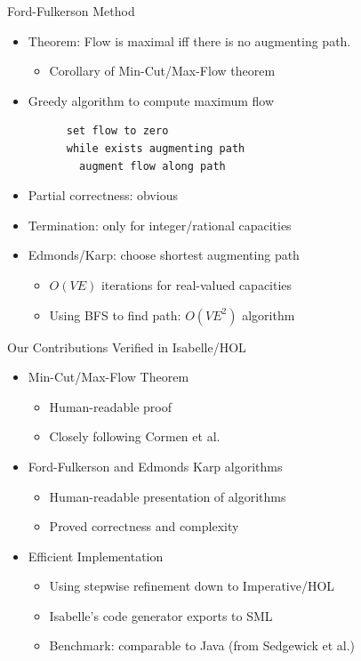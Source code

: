 \documentclass[fleqn]{beamer}
\begin{document}
\begin{frame}[fragile]{Ford-Fulkerson Method}
  \begin{itemize}
   \item<+-> Theorem: Flow is maximal iff there is no augmenting path.
    \begin{itemize}
     \item Corollary of Min-Cut/Max-Flow theorem
    \end{itemize}
   \item<+-> Greedy algorithm to compute maximum flow
    \begin{lstlisting}
      set flow to zero
      while exists augmenting path
        augment flow along path
    \end{lstlisting}%
   \item<+-> Partial correctness: obvious
   \item<+-> Termination: only for integer/rational capacities
   \item<+-> Edmonds/Karp: choose shortest augmenting path
    \begin{itemize}
     \item $O(VE)$ iterations for real-valued capacities
     \item Using BFS to find path: $O(VE^2)$ algorithm

    \end{itemize}
  \end{itemize}
\end{frame}
\begin{frame}{Our Contributions}
  {Verified in Isabelle/HOL}

  \begin{itemize}
   \item<+-> Min-Cut/Max-Flow Theorem
    \begin{itemize}
     \item Human-readable proof
     \item Closely following Cormen et al.
    \end{itemize}
   \item<+-> Ford-Fulkerson and Edmonds Karp algorithms
    \begin{itemize}
     \item Human-readable presentation of algorithms
     \item Proved correctness and complexity
    \end{itemize}
   \item<+-> Efficient Implementation
    \begin{itemize}
     \item Using stepwise refinement down to Imperative/HOL
     \item Isabelle's code generator exports to SML
     \item Benchmark: comparable to Java (from Sedgewick et al.)

    \end{itemize}
  \end{itemize}
\end{frame}
\newcommand{\augment}{{\mathbin\uparrow}}%
\end{document}
